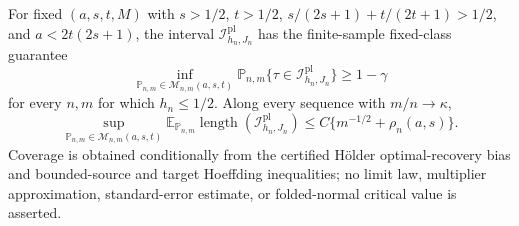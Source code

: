 For fixed \((a,s,t,M)\) with \(s>1/2\), \(t>1/2\), \(s/(2s+1)+t/(2t+1)>1/2\), and \(a<2t(2s+1)\), the interval \(\mathcal I^{\mathrm{pl}}_{h_n,J_n}\) has the finite-sample fixed-class guarantee
\[
\inf_{\mathbb P_{n,m}\in\mathcal M_{n,m}(a,s,t)}
\mathbb P_{n,m}\{\tau\in\mathcal I^{\mathrm{pl}}_{h_n,J_n}\}\ge1-\gamma
\]
for every \(n,m\) for which \(h_n\le1/2\). Along every sequence with \(m/n\to\kappa\),
\[
\sup_{\mathbb P_{n,m}\in\mathcal M_{n,m}(a,s,t)}
\mathbb E_{\mathbb P_{n,m}}\operatorname{length}(\mathcal I^{\mathrm{pl}}_{h_n,J_n})
\le C\{m^{-1/2}+\rho_n(a,s)\}.
\]
Coverage is obtained conditionally from the certified Hölder optimal-recovery bias and bounded-source and target Hoeffding inequalities; no limit law, multiplier approximation, standard-error estimate, or folded-normal critical value is asserted.